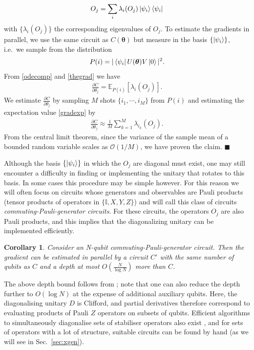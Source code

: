 \documentclass[a4paper,twocolumn,11pt,accepted=2025-09-06]{quantumarticle}
\newtheorem{corollary}{Corollary}
\renewcommand{\vec}{\boldsymbol}
\begin{document}
%
\begin{align}\label{odecomp}
    O_j = \sum_{i} \lambda_i(O_j)\ket{\psi_i}\bra{\psi_i}
\end{align}
%
with $\{\lambda_i(O_j)\}$ the corresponding eigenvalues of $O_j$. To estimate the gradients in parallel, we use the same circuit as $C(\vec{\theta})$ but measure in the basis $\{\ket{\psi_i}\}$, i.e.\ we sample from the distribution 
%
\begin{align}
    P(i) = \vert\bra{\psi_i}U(\vec{\theta})V\ket{0}\vert^2.
\end{align}
%
From \eqref{odecomp} and \eqref{thegrad} we have 
%
\begin{align}\label{gradexp}
    \frac{\partial C}{\partial \theta_j} = \mathbb{E}_{P(i)}[\lambda_i(O_j)].
\end{align}
We estimate $\frac{\partial C}{\partial \theta_j}$ by sampling $M$ shots $\{i_1,\cdots,i_M\}$ from $P(i)$ and estimating the expectation value \eqref{gradexp} by
%
\begin{align}\label{postprocess}
    \frac{\partial C}{\partial \theta_j} \approx \frac{1}{M}\sum_{k=1}^M \lambda_{i_k}(O_j). 
\end{align}
%
From the central limit theorem, since the variance of the sample mean of a bounded random variable scales as $\mathcal{O}(1/M)$, we have proven the claim. $\blacksquare$


Although the basis $\{\ket{\psi_i}\}$ in which the $O_j$ are diagonal must exist, one may still encounter a difficulty in finding or implementing the unitary that rotates to this basis. In some cases this procedure may be simple however. For this reason we will often focus on circuits whose generators and observables are Pauli products (tensor products of operators in $\{\mathbb{I},X,Y,Z\}
$) and will call this class of circuits \emph{commuting-Pauli-generator circuits}. For these circuits, the operators $O_j$ are also Pauli products, and this implies that the diagonalizing unitary can be implemented efficiently.
%
\begin{corollary}
Consider an N-qubit commuting-Pauli-generator circuit. Then the gradient can be estimated in parallel by a circuit ${C}'$ with the same number of qubits as ${C}$ and a depth at most $O\left(\frac{N}{\log N}\right)$ more than ${C}$.
\end{corollary}
%
The above depth bound follows from \cite[Cor 1.1]{jiang2020optimal}; note that one can also reduce the depth further to $O(\log N)$ at the expense of additional auxiliary qubits. Here, the diagonalising unitary $D$ is Clifford, and partial derivatives therefore correspond to evaluating products of Pauli $Z$ operators on subsets of qubits. Efficient algorithms to simultaneously diagonalise sets of stabiliser operators also exist \cite{crawford2021efficient,yen2020measuring,gokhale2019minimizing}, and for sets of operators with a lot of structure, suitable circuits can be found by hand (as we will see in Sec.\ \ref{sec:xgen}). 
\end{document}
